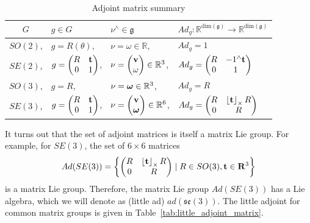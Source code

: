 \begin{table}[hhhht]
\caption{Adjoint matrix summary}
\label{tab:adjoint_matrix}
\bgroup
\def\arraystretch{1.0}
\begin{tabular}{clll}
	\toprule
	$G$ & $g\in G$ & $\nu^\wedge \in \mathfrak{g}$ & $Ad_g: \mathbb{R}^{\text{dim}(\mathfrak{g})} \to \mathbb{R}^{\text{dim}(\mathfrak{g})}$ \\
	\midrule
	$SO(2)$, & $g=R(\theta)$, & $\nu = \omega\in\mathbb{R}$, & $Ad_g = 1$ \\
	$SE(2)$, & $g=\begin{pmatrix} R & \mathbf{t} \\ 0 & 1 \end{pmatrix}$, & $\nu = \begin{pmatrix}\mathbf{v} \\ \omega \end{pmatrix} \in \mathbb{R}^3$, & $Ad_g = \begin{pmatrix} R & -1^\wedge\mathbf{t} \\ 0 & 1 \end{pmatrix}$ \\
	$SO(3)$, & $g=R$, & $\nu = \boldsymbol{\omega} \in \mathbb{R}^3$, & $Ad_g = R$ \\
	$SE(3)$, & $g=\begin{pmatrix} R & \mathbf{t} \\ 0 & 1\end{pmatrix}$, & $\nu = \begin{pmatrix}\mathbf{v} \\ \boldsymbol{\omega} \end{pmatrix} \in \mathbb{R}^6$, & $Ad_g = \begin{pmatrix} R & \left\lfloor\mathbf{t}\right\rfloor_{\times} R \\ 0 & R \end{pmatrix}$ \\
	\bottomrule
\end{tabular}
\egroup
\end{table}

It turns out that the set of adjoint matrices is itself a matrix Lie group.  For example, for $SE(3)$, the set of $6\times 6$ matrices
\[
Ad(SE(3)) = \left\{ \begin{pmatrix} R & \left\lfloor\mathbf{t}\right\rfloor_{\times} R \\ 0 & R \end{pmatrix} \mid R\in SO(3), \mathbf{t}\in\mathbf{R}^3 \right\}
\]
is a matrix Lie group.  Therefore, the matrix Lie group $Ad(SE(3))$ has a Lie algebra, which we will denote as (little ad) $ad(\mathfrak{se}(3))$.  The little adjoint for common matrix groups is given in Table~\ref{tab:little_adjoint_matrix}.

